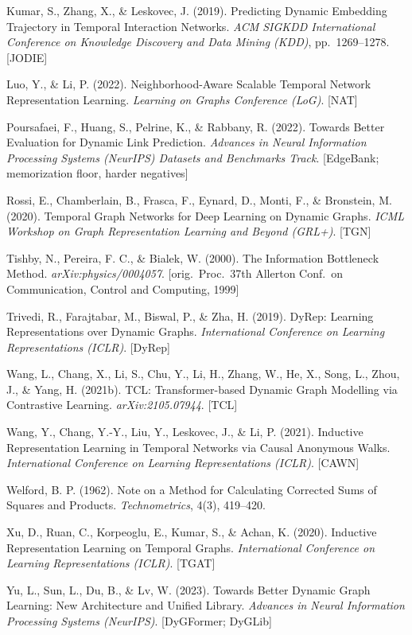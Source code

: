 \documentclass[conference]{IEEEtran}
\begin{document}
{\begin{list}{}{\setlength{\leftmargin}{1em}\setlength{\itemindent}{-1em}\setlength{\itemsep}{2pt}\setlength{\parsep}{0pt}}
\item Kumar, S., Zhang, X., \& Leskovec, J. (2019). Predicting Dynamic Embedding Trajectory in Temporal Interaction Networks. \emph{ACM SIGKDD International Conference on Knowledge Discovery and Data Mining (KDD)}, pp.\ 1269--1278. [JODIE]
\item Luo, Y., \& Li, P. (2022). Neighborhood-Aware Scalable Temporal Network Representation Learning. \emph{Learning on Graphs Conference (LoG)}. [NAT]
\item Poursafaei, F., Huang, S., Pelrine, K., \& Rabbany, R. (2022). Towards Better Evaluation for Dynamic Link Prediction. \emph{Advances in Neural Information Processing Systems (NeurIPS) Datasets and Benchmarks Track}. [EdgeBank; memorization floor, harder negatives]
\item Rossi, E., Chamberlain, B., Frasca, F., Eynard, D., Monti, F., \& Bronstein, M. (2020). Temporal Graph Networks for Deep Learning on Dynamic Graphs. \emph{ICML Workshop on Graph Representation Learning and Beyond (GRL+)}. [TGN]
\item Tishby, N., Pereira, F. C., \& Bialek, W. (2000). The Information Bottleneck Method. \emph{arXiv:physics/0004057}. [orig.\ Proc.\ 37th Allerton Conf.\ on Communication, Control and Computing, 1999]
\item Trivedi, R., Farajtabar, M., Biswal, P., \& Zha, H. (2019). DyRep: Learning Representations over Dynamic Graphs. \emph{International Conference on Learning Representations (ICLR)}. [DyRep]
\item Wang, L., Chang, X., Li, S., Chu, Y., Li, H., Zhang, W., He, X., Song, L., Zhou, J., \& Yang, H. (2021b). TCL: Transformer-based Dynamic Graph Modelling via Contrastive Learning. \emph{arXiv:2105.07944}. [TCL]
\item Wang, Y., Chang, Y.-Y., Liu, Y., Leskovec, J., \& Li, P. (2021). Inductive Representation Learning in Temporal Networks via Causal Anonymous Walks. \emph{International Conference on Learning Representations (ICLR)}. [CAWN]
\item Welford, B. P. (1962). Note on a Method for Calculating Corrected Sums of Squares and Products. \emph{Technometrics}, 4(3), 419--420.
\item Xu, D., Ruan, C., Korpeoglu, E., Kumar, S., \& Achan, K. (2020). Inductive Representation Learning on Temporal Graphs. \emph{International Conference on Learning Representations (ICLR)}. [TGAT]
\item Yu, L., Sun, L., Du, B., \& Lv, W. (2023). Towards Better Dynamic Graph Learning: New Architecture and Unified Library. \emph{Advances in Neural Information Processing Systems (NeurIPS)}. [DyGFormer; DyGLib]
\end{list}
}
\end{document}
